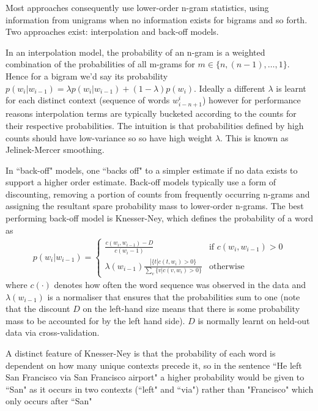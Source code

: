 Most approaches consequently use lower-order n-gram statistics, using information from unigrams when no information exists for bigrams and so forth. Two approaches exist: interpolation and back-off models.

In an interpolation model, the probability of an n-gram is a weighted combination of the probabilities of all m-grams for $m \in \{n, (n-1), \ldots, 1\}$. Hence for a bigram we'd say its probability $p(w_i|w_{i-1}) = \lambda p(w_i|w_{i-1}) + (1 - \lambda) p(w_i)$. Ideally a different $\lambda$ is learnt for each distinct context (sequence of words $w^i_{i-n+1}$) however for performance reasons interpolation terms are typically bucketed according to the counts for their respective probabilities. The intuition is that probabilities defined by high counts should have low-variance so so have high weight $\lambda$. This is known as Jelinek-Mercer smoothing.

In ``back-off" models, one ``backs off" to a simpler estimate if no data exists to support a higher order estimate. Back-off models typically use a form of discounting, removing a portion of counts from frequently occurring n-grams and assigning the resultant spare probability mass to lower-order n-grams. The best performing back-off model is Knesser-Ney, which defines the probability of a word as 
\begin{align}
p(w_i | w_{i-1}) = \left\{ \begin{array}{lr}
     \frac{c(w_i, w_{i-1}) - D}{c(w_i-1)} & \text{if } c(w_i, w_{i-1}) > 0 \\
     \lambda(w_{i-1})\frac{ | \{t | c(t, w_i) > 0\} }{\sum_v \{v | c(v, w_i) > 0\}} & \text{otherwise}
 \end{array}
\right.
\end{align}
where $c(\cdot)$ denotes how often the word sequence was observed in the data and $\lambda(w_{i-1})$ is a normaliser that ensures that the probabilities sum to one (note that the discount $D$ on the left-hand size means that there is some probability mass to be accounted for by the left hand side). $D$ is normally learnt on held-out data via cross-validation.

A distinct feature of Knesser-Ney is that the probability of each word is dependent on how many unique contexts precede it, so in the sentence ``He left San Francisco via San Francisco airport" a higher probability would be given to ``San" as it occurs in two contexts (``left" and ``via") rather than "Francisco" which only occurs after ``San"


